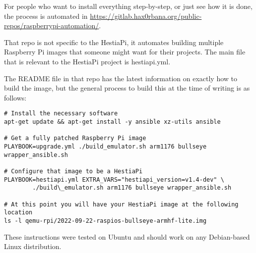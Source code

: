 For people who want to install everything step-by-step, or just see how it is
done, the process is automated in
\url{https://gitlab.hax0rbana.org/public-repos/raspberrypi-automation/}.

That repo is not specific to the HestiaPi, it automates building multiple
Raspberry Pi images that someone might want for their projects. The main file
that is relevant to the HestiaPi project is hestiapi.yml.

The README file in that repo has the latest information on exactly how to build
the image, but the general process to build this at the time of writing is as
follows:

\begin{verbatim}
# Install the necessary software
apt-get update && apt-get install -y ansible xz-utils ansible

# Get a fully patched Raspberry Pi image
PLAYBOOK=upgrade.yml ./build_emulator.sh arm1176 bullseye wrapper_ansible.sh

# Configure that image to be a HestiaPi
PLAYBOOK=hestiapi.yml EXTRA_VARS="hestiapi_version=v1.4-dev" \
        ./build\_emulator.sh arm1176 bullseye wrapper_ansible.sh

# At this point you will have your HestiaPi image at the following location
ls -l qemu-rpi/2022-09-22-raspios-bullseye-armhf-lite.img
\end{verbatim}

These instructions were tested on Ubuntu and should work on any Debian-based
Linux distribution.
